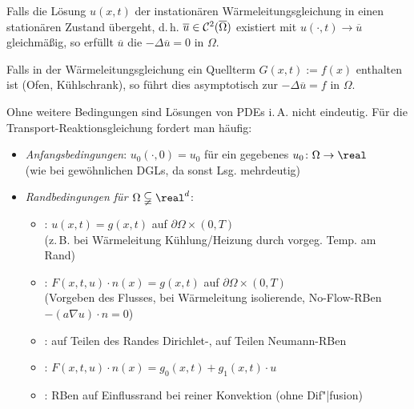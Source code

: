 \linie

\begin{Bsp}
    Falls die Lösung $u(x, t)$ der instationären Wärmeleitungsgleichung in einen stationären
    Zustand übergeht, d.\,h. $\overline{u} \in \mathcal{C}^2(\overline{\Omega})$ existiert mit
    $u(\cdot, t) \to \overline{u}$ gleichmäßig, so erfüllt $\overline{u}$ die
     $-\Delta \overline{u} = 0$ in $\Omega$.

    Falls in der Wärmeleitungsgleichung ein Quellterm $G(x, t) := f(x)$ enthalten ist
    (Ofen, Kühlschrank), so führt dies asymptotisch zur
     $-\Delta \overline{u} = f$ in $\Omega$.
\end{Bsp}

\linie

\begin{Bem}
    Ohne weitere Bedingungen sind Lösungen von PDEs i.\,A. nicht eindeutig.
    Für die Transport-Reaktionsgleichung fordert man häufig:
    \begin{itemize}
        \item
        \emph{Anfangsbedingungen}:
        $u_0(\cdot, 0) = u_0$ für ein gegebenes $u_0\colon \Omega \to \real$\\
        (wie bei gewöhnlichen DGLs, da sonst Lsg. mehrdeutig)

        \item
        \emph{Randbedingungen für $\Omega \subsetneqq \real^d$}:
        \begin{itemize}
            \item
            :
            $u(x, t) = g(x, t)$ auf $\partial\Omega \times (0, T)$\\
            (z.\,B. bei Wärmeleitung Kühlung/Heizung durch vorgeg. Temp. am Rand)

            \item
            :
            $F(x, t, u) \cdot n(x) = g(x, t)$ auf $\partial\Omega \times (0, T)$\\
            (Vorgeben des Flusses, bei Wärmeleitung isolierende, No-Flow-RBen
            $-(a \nabla u) \cdot n = 0$)

            \item
            :
            auf Teilen des Randes Dirichlet-, auf Teilen Neumann-RBen

            \item
            :
            $F(x, t, u) \cdot n(x) = g_0(x, t) + g_1(x, t) \cdot u$

            \item
            :
            RBen auf Einflussrand bei reiner Konvektion (ohne Dif"|fusion)
        \end{itemize}
    \end{itemize}
\end{Bem}

